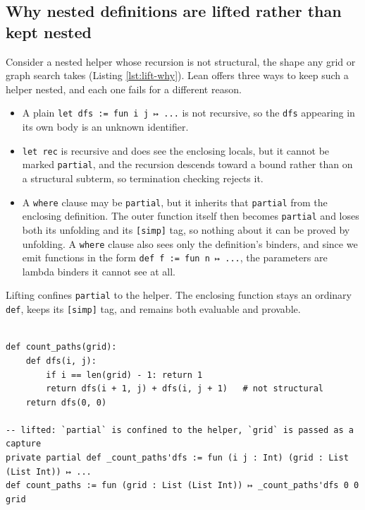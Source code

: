 \documentclass{article}
\newcommand{\code}{\lstinline}
\begin{document}
\subsection{Why nested definitions are lifted rather than kept nested}\label{app:lifting}

Consider a nested helper whose recursion is not structural, the shape any grid or graph search takes (Listing \ref{lst:lift-why}). Lean offers three ways to keep such a helper nested, and each one fails for a different reason.

\begin{itemize}
\item A plain \code{let dfs := fun i j ↦ ...} is not recursive, so the \code{dfs} appearing in its own body is an unknown identifier.
\item \code{let rec} is recursive and does see the enclosing locals, but it cannot be marked \code{partial}, and the recursion descends toward a bound rather than on a structural subterm, so termination checking rejects it.
\item A \code{where} clause may be \code{partial}, but it inherits that \code{partial} from the enclosing definition. The outer function itself then becomes \code{partial} and loses both its unfolding and its \code{[simp]} tag, so nothing about it can be proved by unfolding. A \code{where} clause also sees only the definition's binders, and since we emit functions in the form \code{def f := fun n ↦ ...}, the parameters are lambda binders it cannot see at all.
\end{itemize}

Lifting confines \code{partial} to the helper. The enclosing function stays an ordinary \code{def}, keeps its \code{[simp]} tag, and remains both evaluable and provable.

\begin{lstlisting}[style=lean,caption={A non-structural nested recursion, and the lifted form.},label={lst:lift-why}]

def count_paths(grid):
    def dfs(i, j):
        if i == len(grid) - 1: return 1
        return dfs(i + 1, j) + dfs(i, j + 1)   # not structural
    return dfs(0, 0)

-- lifted: `partial` is confined to the helper, `grid` is passed as a capture
private partial def _count_paths'dfs := fun (i j : Int) (grid : List (List Int)) ↦ ...
def count_paths := fun (grid : List (List Int)) ↦ _count_paths'dfs 0 0 grid
\end{lstlisting}
\end{document}
